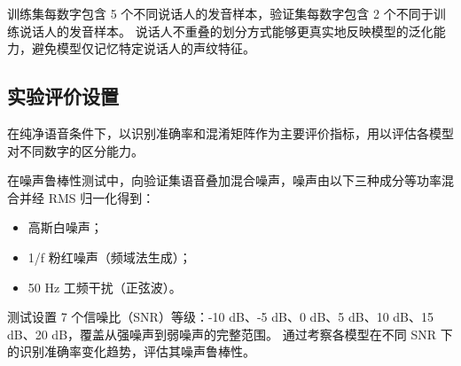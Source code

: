 训练集每数字包含 5 个不同说话人的发音样本，验证集每数字包含 2 个不同于训练说话人的发音样本。
说话人不重叠的划分方式能够更真实地反映模型的泛化能力，避免模型仅记忆特定说话人的声纹特征。

\subsection{实验评价设置}

在纯净语音条件下，以识别准确率和混淆矩阵作为主要评价指标，用以评估各模型对不同数字的区分能力。

在噪声鲁棒性测试中，向验证集语音叠加混合噪声，噪声由以下三种成分等功率混合并经 RMS 归一化得到：
\begin{itemize}
  \item 高斯白噪声；
  \item 1/f 粉红噪声（频域法生成）；
  \item 50 Hz 工频干扰（正弦波）。
\end{itemize}

测试设置 7 个信噪比（SNR）等级：-10 dB、-5 dB、0 dB、5 dB、10 dB、15 dB、20 dB，覆盖从强噪声到弱噪声的完整范围。
通过考察各模型在不同 SNR 下的识别准确率变化趋势，评估其噪声鲁棒性。
